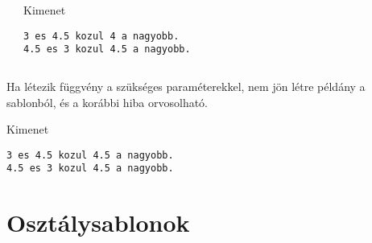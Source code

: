 \documentclass[usenames,dvipsnames,aspectratio=169]{beamer}
\begin{document}
\begin{frame}[fragile]
    \begin{columns}[T]
            \begin{exampleblock}{}
                \scriptsize
                
            \end{exampleblock}
            \begin{block}{Kimenet}
                \footnotesize
                \vspace{-.4cm}
                \begin{verbatim}
3 es 4.5 kozul 4 a nagyobb.
4.5 es 3 kozul 4.5 a nagyobb.
                \end{verbatim}
                \vspace{-.4cm}
            \end{block}
    \end{columns}
\end{frame}

\begin{frame}[fragile]
    Ha létezik függvény a szükséges paraméterekkel, nem jön létre példány a sablonból, és a korábbi hiba orvosolható.
    \begin{exampleblock}{}
        \scriptsize
        
    \end{exampleblock}
    \begin{block}{Kimenet}
        \footnotesize
        \vspace{-.4cm}
        \begin{verbatim}
3 es 4.5 kozul 4.5 a nagyobb.
4.5 es 3 kozul 4.5 a nagyobb.
        \end{verbatim}
        \vspace{-.4cm}
    \end{block}
\end{frame}

\section{Osztálysablonok}
\end{document}
